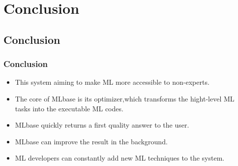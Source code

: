 \section{Conclusion}

\subsection{Conclusion}
\begin{frame}
    \frametitle{Conclusion}
	\begin{itemize}
		\item This system aiming to make ML more accessible to non-experts.  
		\item The core of MLbase is its optimizer,which transforms  the hight-level ML tasks into the executable ML codes.
		\item MLbase quickly returns a first quality answer to the user. 
		\item MLbase can improve the result in the background. 
		\item ML developers can constantly add new ML techniques to the system. 
	\end{itemize} 
\end{frame}



